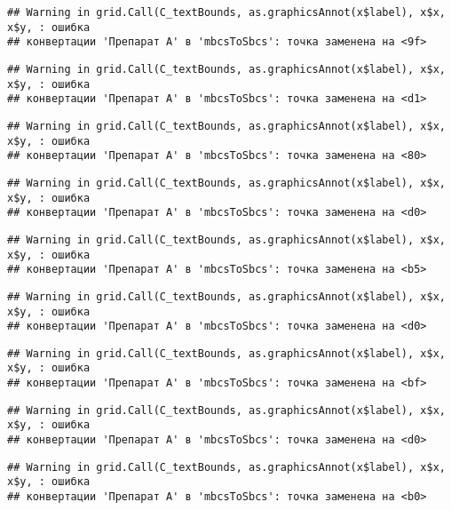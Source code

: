 \documentclass[
]{article}
\begin{document}
\begin{verbatim}
## Warning in grid.Call(C_textBounds, as.graphicsAnnot(x$label), x$x, x$y, : ошибка
## конвертации 'Препарат A' в 'mbcsToSbcs': точка заменена на <9f>
\end{verbatim}

\begin{verbatim}
## Warning in grid.Call(C_textBounds, as.graphicsAnnot(x$label), x$x, x$y, : ошибка
## конвертации 'Препарат A' в 'mbcsToSbcs': точка заменена на <d1>
\end{verbatim}

\begin{verbatim}
## Warning in grid.Call(C_textBounds, as.graphicsAnnot(x$label), x$x, x$y, : ошибка
## конвертации 'Препарат A' в 'mbcsToSbcs': точка заменена на <80>
\end{verbatim}

\begin{verbatim}
## Warning in grid.Call(C_textBounds, as.graphicsAnnot(x$label), x$x, x$y, : ошибка
## конвертации 'Препарат A' в 'mbcsToSbcs': точка заменена на <d0>
\end{verbatim}

\begin{verbatim}
## Warning in grid.Call(C_textBounds, as.graphicsAnnot(x$label), x$x, x$y, : ошибка
## конвертации 'Препарат A' в 'mbcsToSbcs': точка заменена на <b5>
\end{verbatim}

\begin{verbatim}
## Warning in grid.Call(C_textBounds, as.graphicsAnnot(x$label), x$x, x$y, : ошибка
## конвертации 'Препарат A' в 'mbcsToSbcs': точка заменена на <d0>
\end{verbatim}

\begin{verbatim}
## Warning in grid.Call(C_textBounds, as.graphicsAnnot(x$label), x$x, x$y, : ошибка
## конвертации 'Препарат A' в 'mbcsToSbcs': точка заменена на <bf>
\end{verbatim}

\begin{verbatim}
## Warning in grid.Call(C_textBounds, as.graphicsAnnot(x$label), x$x, x$y, : ошибка
## конвертации 'Препарат A' в 'mbcsToSbcs': точка заменена на <d0>
\end{verbatim}

\begin{verbatim}
## Warning in grid.Call(C_textBounds, as.graphicsAnnot(x$label), x$x, x$y, : ошибка
## конвертации 'Препарат A' в 'mbcsToSbcs': точка заменена на <b0>
\end{verbatim}
\end{document}
